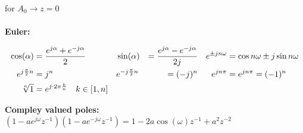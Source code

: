 for $A_0 \rightarrow z=0$\\ \\

\textbf{Euler:}

\begin{align}
\cos(\alpha) &= \frac{e^{j\alpha} + e^{-j\alpha}}{2}
		&& \sin(\alpha) &= \frac{e^{j\alpha} - e^{-j\alpha}}{2j} 
		&& {e}^{\pm jn\omega} &= \cos{n\omega} \pm j \sin{n\omega} \notag\\
e^{j\frac{\pi}{2}n} &= j^n 
		&& e^{-j\frac{\pi}{2}n} &= (-j)^n 
		&& e^{jn\pi}&=e^{jn\pi}=(-1)^n \notag \\
\sqrt[n]{1} &= e^{j\cdot 2\pi \frac{k}{n}} \quad k \in [1,n] && && \notag
\end{align}

\textbf{Compley valued poles:}
$(1-ae^{j\omega}z^{-1})(1-ae^{-j\omega}z^{-1}) = 1 - 2a\cos(\omega)z^{-1}+a^2z^{-2}$


